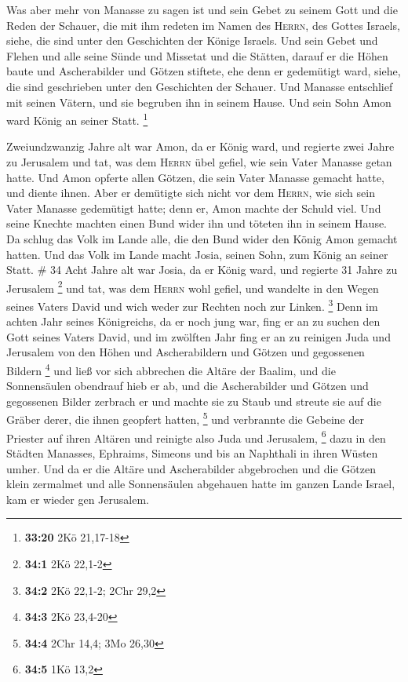  Was aber mehr von Manasse zu sagen ist und sein Gebet zu
seinem Gott und die Reden der Schauer, die mit ihm redeten im Namen des
\textsc{Herrn}, des Gottes Israels, siehe, die sind unter den
Geschichten der Könige Israels.  Und sein Gebet und
Flehen und alle seine Sünde und Missetat und die Stätten, darauf er die
Höhen baute und Ascherabilder und Götzen stiftete, ehe denn er
gedemütigt ward, siehe, die sind geschrieben unter den Geschichten der
Schauer.  Und Manasse entschlief mit seinen Vätern, und
sie begruben ihn in seinem Hause. Und sein Sohn Amon ward König an
seiner Statt. \footnote{\textbf{33:20} 2Kö 21,17-18}

 Zweiundzwanzig Jahre alt war Amon, da er König ward, und
regierte zwei Jahre zu Jerusalem  und tat, was dem
\textsc{Herrn} übel gefiel, wie sein Vater Manasse getan hatte. Und Amon
opferte allen Götzen, die sein Vater Manasse gemacht hatte, und diente
ihnen.  Aber er demütigte sich nicht vor dem
\textsc{Herrn}, wie sich sein Vater Manasse gedemütigt hatte; denn er,
Amon machte der Schuld viel.  Und seine Knechte machten
einen Bund wider ihn und töteten ihn in seinem Hause.  Da
schlug das Volk im Lande alle, die den Bund wider den König Amon gemacht
hatten. Und das Volk im Lande macht Josia, seinen Sohn, zum König an
seiner Statt. \# 34  Acht Jahre alt war Josia, da er König
ward, und regierte 31 Jahre zu Jerusalem \footnote{\textbf{34:1} 2Kö
  22,1-2}  und tat, was dem \textsc{Herrn} wohl gefiel,
und wandelte in den Wegen seines Vaters David und wich weder zur Rechten
noch zur Linken. \footnote{\textbf{34:2} 2Kö 22,1-2; 2Chr 29,2}
 Denn im achten Jahr seines Königreichs, da er noch jung
war, fing er an zu suchen den Gott seines Vaters David, und im zwölften
Jahr fing er an zu reinigen Juda und Jerusalem von den Höhen und
Ascherabildern und Götzen und gegossenen Bildern \footnote{\textbf{34:3}
  2Kö 23,4-20}  und ließ vor sich abbrechen die Altäre der
Baalim, und die Sonnensäulen obendrauf hieb er ab, und die Ascherabilder
und Götzen und gegossenen Bilder zerbrach er und machte sie zu Staub und
streute sie auf die Gräber derer, die ihnen geopfert hatten, \footnote{\textbf{34:4}
  2Chr 14,4; 3Mo 26,30}  und verbrannte die Gebeine der
Priester auf ihren Altären und reinigte also Juda und Jerusalem,
\footnote{\textbf{34:5} 1Kö 13,2}  dazu in den Städten
Manasses, Ephraims, Simeons und bis an Naphthali in ihren Wüsten umher.
 Und da er die Altäre und Ascherabilder abgebrochen und
die Götzen klein zermalmet und alle Sonnensäulen abgehauen hatte im
ganzen Lande Israel, kam er wieder gen Jerusalem.

